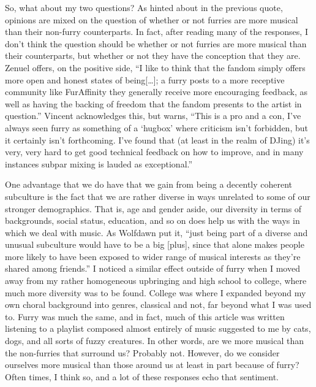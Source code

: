 So, what about my two questions? As hinted about in the previous quote, opinions are mixed on the question of whether or not furries are more musical than their non-furry counterparts. In fact, after reading many of the responses, I don't think the question should be whether or not furries are more musical than their counterparts, but whether or not they have the conception that they are. Zenuel offers, on the positive side, ``I like to think that the fandom simply offers more open and honest states of being{[}\ldots{}{]}; a furry posts to a more receptive community like FurAffinity they generally receive more encouraging feedback, as well as having the backing of freedom that the fandom presents to the artist in question.'' Vincent acknowledges this, but warns, ``This is a pro and a con, I've always seen furry as something of a `hugbox' where criticism isn't forbidden, but it certainly isn't forthcoming. I've found that (at least in the realm of DJing) it's very, very hard to get good technical feedback on how to improve, and in many instances subpar mixing is lauded as exceptional.''

One advantage that we do have that we gain from being a decently coherent subculture is the fact that we are rather diverse in ways unrelated to some of our stronger demographics. That is, age and gender aside, our diversity in terms of backgrounds, social status, education, and so on does help us with the ways in which we deal with music. As Wolfdawn put it, ``just being part of a diverse and unusual subculture would have to be a big {[}plus{]}, since that alone makes people more likely to have been exposed to wider range of musical interests as they're shared among friends.'' I noticed a similar effect outside of furry when I moved away from my rather homogeneous upbringing and high school to college, where much more diversity was to be found. College was where I expanded beyond my own choral background into genres, classical and not, far beyond what I was used to. Furry was much the same, and in fact, much of this article was written listening to a playlist composed almost entirely of music suggested to me by cats, dogs, and all sorts of fuzzy creatures. In other words, are we more musical than the non-furries that surround us? Probably not. However, do we consider ourselves more musical than those around us at least in part because of furry? Often times, I think so, and a lot of these responses echo that sentiment.

